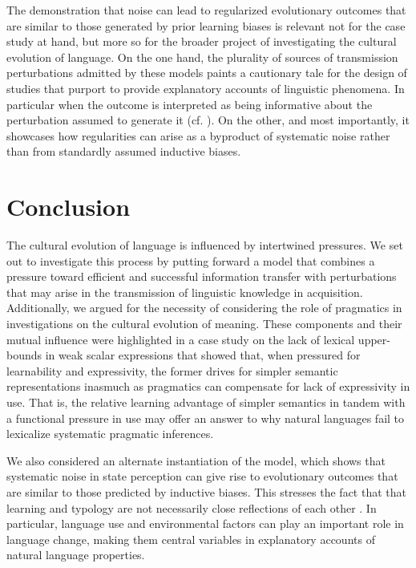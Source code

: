 \documentclass[a4paper]{article}
\begin{document}
The demonstration that noise can lead to regularized evolutionary outcomes that are similar to those generated by prior learning biases is relevant not for the case study at hand, but more so for the broader project of investigating the cultural evolution of language. On the one hand, the plurality of sources of transmission perturbations admitted by these models paints a cautionary tale for the design of studies that purport to provide explanatory accounts of linguistic phenomena. In particular when the outcome is interpreted as being informative about the perturbation assumed to generate it (cf. \citealt{tamariz+kirby:2016}). On the other, and most importantly, it showcases how regularities can arise as a byproduct of systematic noise rather than from standardly assumed inductive biases.



\section{Conclusion}
The cultural evolution of language is influenced by intertwined pressures. We set out to investigate this process by putting forward a model that combines a pressure toward efficient and successful information transfer with perturbations that may arise in the transmission of linguistic knowledge in acquisition. Additionally, we argued for the necessity of considering the role of pragmatics in investigations on the cultural evolution of meaning. These components and their mutual influence were highlighted in a case study on the lack of lexical upper-bounds in weak scalar expressions that showed that, when pressured for learnability and expressivity, the former drives for simpler semantic representations inasmuch as pragmatics can compensate for lack of expressivity in use. That is, the relative learning advantage of simpler semantics in tandem with a functional pressure in use may offer an answer to why natural languages fail to lexicalize systematic pragmatic inferences.

We also considered an alternate instantiation of the model, which shows that systematic noise in state perception can give rise to evolutionary outcomes that are similar to those predicted by inductive biases. This stresses the fact that that learning and typology are not necessarily close reflections of each other \citep{bowerman:2010}. In particular, language use and environmental factors can play an important role in language change, making them central variables in explanatory accounts of natural language properties.  




\end{document}
